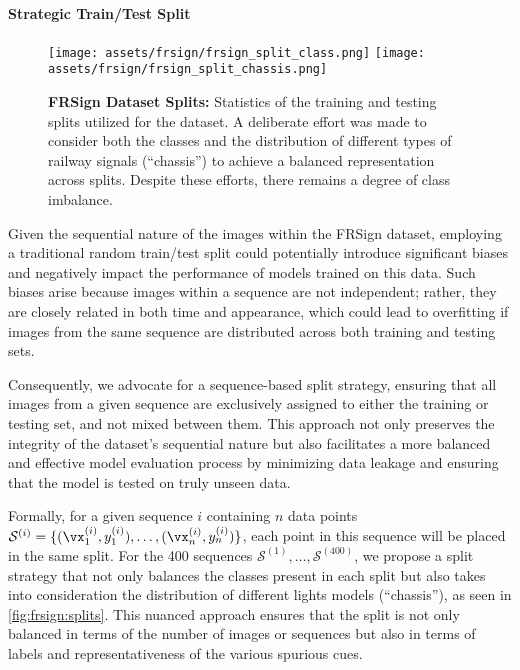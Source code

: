 \paragraph{Strategic Train/Test Split}

\begin{figure}[ht]
    \centering
    \texttt{[image: assets/frsign/frsign\_split\_class.png]}
    \texttt{[image: assets/frsign/frsign\_split\_chassis.png]}
    \caption{\textbf{FRSign Dataset Splits:} Statistics of the training and testing splits utilized for the dataset. A deliberate effort was made to consider both the classes and the distribution of different types of railway signals (``chassis'') to achieve a balanced representation across splits. Despite these efforts, there remains a degree of class imbalance.}
    \label{fig:frsign:splits}
\end{figure}

Given the sequential nature of the images within the FRSign dataset, employing a traditional random train/test split could potentially introduce significant biases and negatively impact the performance of models trained on this data. Such biases arise because images within a sequence are not independent; rather, they are closely related in both time and appearance, which could lead to overfitting if images from the same sequence are distributed across both training and testing sets.

Consequently, we advocate for a sequence-based split strategy, ensuring that all images from a given sequence are exclusively assigned to either the training or testing set, and not mixed between them. This approach not only preserves the integrity of the dataset's sequential nature but also facilitates a more balanced and effective model evaluation process by minimizing data leakage and ensuring that the model is tested on truly unseen data.

Formally, for a given sequence \(i\) containing \(n\) data points \(\mathcal{S}^{(i)} = \{ (\vx_1^{(i)}, y_1^{(i)}), \ldots, (\vx_n^{(i)}, y_n^{(i)}) \}\), each point in this sequence will be placed in the same split. For the 400 sequences \(\mathcal{S}^{(1)}, \ldots, \mathcal{S}^{(400)}\), we propose a split strategy that not only balances the classes present in each split but also takes into consideration the distribution of different lights models (``chassis''), as seen in \autoref{fig:frsign:splits}. This nuanced approach ensures that the split is not only balanced in terms of the number of images or sequences but also in terms of labels and representativeness of the various spurious cues. 


